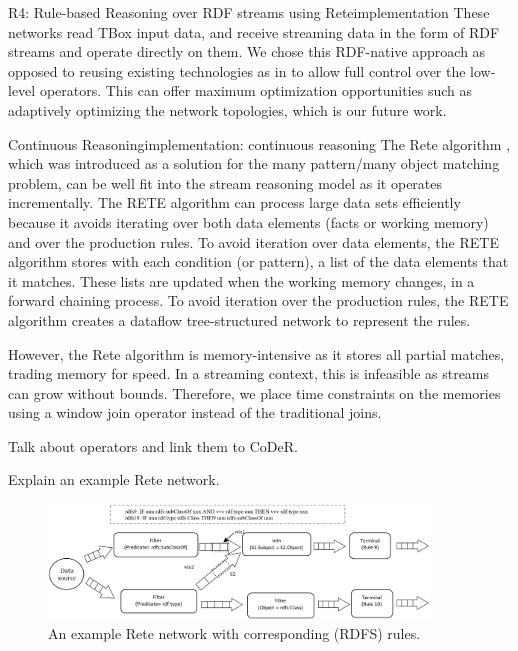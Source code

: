 \begin{nestedsection}{R4: Rule-based Reasoning over RDF streams using Rete}{implementation}
	These networks read TBox input data, and receive streaming data in the form of RDF streams and operate directly on them.
	We chose this RDF-native approach as opposed to reusing existing technologies as in \citep{C-SPARQL,streaming-sparql} to allow full control over the low-level operators.
	This can offer maximum optimization opportunities such as adaptively optimizing the network topologies, which is our future work.

	\begin{nestedsection}{Continuous Reasoning}{implementation: continuous reasoning}
		The Rete algorithm \citep{forgy79}, which was introduced as a solution for the many pattern/many object matching problem, can be well fit into the stream reasoning model as it operates incrementally.
		The RETE algorithm can process large data sets efficiently because it avoids iterating over both data elements (facts or working memory) and over the production rules.
		To avoid iteration over data elements, the RETE algorithm stores with each condition (or pattern), a list of the data elements that it matches.
		These lists are updated when the working memory changes, in a forward chaining process.
		To avoid iteration over the production rules, the RETE algorithm creates a dataflow tree-structured network to represent the rules.
		
		However, the Rete algorithm is memory-intensive as it stores all partial matches, trading memory for speed.
		In a streaming context, this is infeasible as streams can grow without bounds.
		Therefore, we place time constraints on the memories using a window join operator instead of the traditional joins.

		Talk about operators and link them to CoDeR.

 		Explain an example Rete network.

 		\begin{figure}
 			\centering
 			\includegraphics[width=0.9\textwidth]{example-rete-network}
 			\caption{An example Rete network with corresponding (RDFS) rules.}
 		\end{figure}
	\end{nestedsection}
\end{nestedsection}
